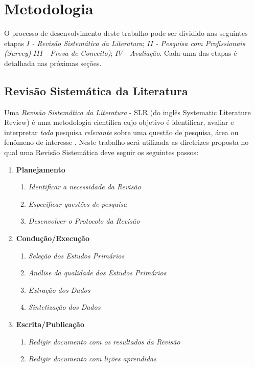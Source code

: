 \documentclass[msc,proposal,hidelot,hideabstract]{ppgccufmg} %
\begin{document}
\chapter{Metodologia}
\label{ch:metodologia}

O processo de desenvolvimento deste trabalho pode ser dividido nas seguintes
etapas $I$\textit{ - Revisão Sistemática da Literatura}; $II$\textit{ - Pesquisa
  com Profissionais (Survey)} $III$\textit{ - Prova de Conceito)}; $IV$\textit{ - Avaliação}. Cada uma das etapas é detalhada nas próximas seções.

\section{Revisão Sistemática da Literatura}
\label{sec:revisao_sistematica}

Uma \textit{Revisão Sistemática da Literatura} - SLR (do inglês Systematic Literature Review) é uma
metodologia científica cujo objetivo é identificar, avaliar e interpretar
\textit{toda} pesquisa \textit{relevante} sobre uma questão de pesquisa, área
ou fenômeno de interesse \cite{keele2007guidelines,wohlin2012experimentation}. Neste trabalho
será utilizada as diretrizes proposta \cite{keele2007guidelines} no qual uma
Revisão Sistemática deve seguir os seguintes passos:

\begin{enumerate}
  \item \textbf{Planejamento}
  \begin{enumerate}
    \item \textit{Identificar a necessidade da Revisão}
    \item \textit{Especificar questões de pesquisa}
    \item \textit{Desenvolver o Protocolo da Revisão}
  \end{enumerate}
  \item \textbf{Condução/Execução}
  \begin{enumerate}
    \item \textit{Seleção dos Estudos Primários}
    \item \textit{Análise da qualidade dos Estudos Primários}
     \item \textit{Extração dos Dados}
     \item \textit{Sintetização dos Dados}
   \end{enumerate}
  \item \textbf{Escrita/Publicação}
  \begin{enumerate}
    \item \textit{Redigir documento com os resultados da Revisão}
    \item \textit{Redigir documento com lições aprendidas}
  \end{enumerate}
\end{enumerate}
\end{document}
